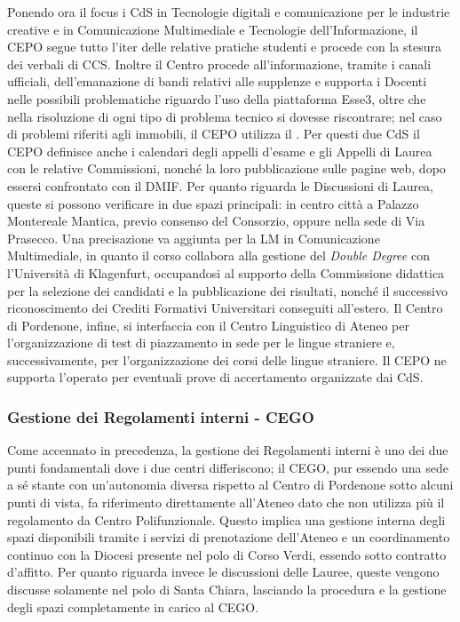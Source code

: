             Ponendo ora il focus i CdS in Tecnologie digitali e comunicazione per le industrie creative e in Comunicazione Multimediale e Tecnologie dell'Informazione, il CEPO segue tutto l'iter delle relative pratiche studenti e procede con la stesura dei verbali di CCS. Inoltre il Centro procede all'informazione, tramite i canali ufficiali, dell'emanazione di bandi relativi alle supplenze e supporta i Docenti nelle possibili problematiche riguardo l'uso della piattaforma Esse3, oltre che nella risoluzione di ogni tipo di problema tecnico si dovesse riscontrare; nel caso di problemi riferiti agli immobili, il CEPO utilizza il \cite{PortaleSelfServiceSysAid}. Per questi due CdS il CEPO definisce anche i calendari degli appelli d'esame e gli Appelli di Laurea con le relative Commissioni, nonché la loro pubblicazione sulle pagine web, dopo essersi confrontato con il DMIF. Per quanto riguarda le Discussioni di Laurea, queste si possono verificare in due spazi principali: in centro città a Palazzo Montereale Mantica, previo consenso del Consorzio, oppure nella sede di Via Prasecco. \newline
            Una precisazione va aggiunta per la LM in Comunicazione Multimediale, in quanto il corso collabora alla gestione del \textit{Double Degree} con l'Università di Klagenfurt, occupandosi al supporto della Commissione didattica per la selezione dei candidati e la pubblicazione dei risultati, nonché il successivo riconoscimento dei Crediti Formativi Universitari conseguiti all'estero. \newline
            Il Centro di Pordenone, infine, si interfaccia con il Centro Linguistico di Ateneo per l'organizzazione di test di piazzamento in sede per le lingue straniere e, successivamente, per l'organizzazione dei corsi delle lingue straniere. Il CEPO ne supporta l'operato per eventuali prove di accertamento organizzate dai CdS. 
        \subsubsection{Gestione dei Regolamenti interni - CEGO}
            Come accennato in precedenza, la gestione dei Regolamenti interni è uno dei due punti fondamentali dove i due centri differiscono; il CEGO, pur essendo una sede a sé stante con un'autonomia diversa rispetto al Centro di Pordenone sotto alcuni punti di vista, fa riferimento direttamente all'Ateneo dato che non utilizza più il regolamento da Centro Polifunzionale. Questo implica una gestione interna degli spazi disponibili tramite i servizi di prenotazione dell'Ateneo e un coordinamento continuo con la Diocesi presente nel polo di Corso Verdi, essendo sotto contratto d'affitto. \newline
            Per quanto riguarda invece le discussioni delle Lauree, queste vengono discusse solamente nel polo di Santa Chiara, lasciando la procedura e la gestione degli spazi completamente in carico al CEGO. 
